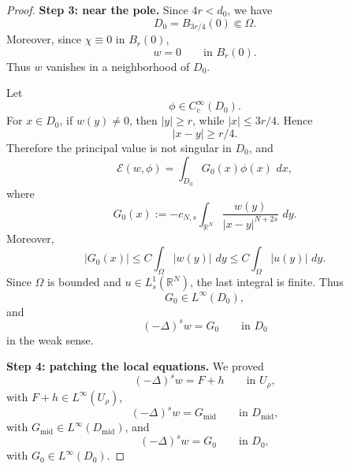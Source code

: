 \documentclass[11pt,a4paper]{article}
\newcommand{\dd}{\,d}
\begin{document}
\begin{proof}
\medskip
\noindent\textbf{Step 3: near the pole.}
Since \(4r<d_0\), we have
\[
D_0=B_{3r/4}(0)\Subset\Omega.
\]
Moreover, since \(\chi\equiv0\) in \(B_r(0)\),
\[
w=0\qquad\text{in }B_r(0).
\]
Thus \(w\) vanishes in a neighborhood of \(D_0\).

Let
\[
\phi\in C_c^\infty(D_0).
\]
For \(x\in D_0\), if \(w(y)\neq0\), then \(|y|\ge r\), while
\(|x|\le3r/4\). Hence
\[
|x-y|\ge r/4.
\]
Therefore the principal value is not singular in \(D_0\), and
\[
\mathcal E(w,\phi)
=
\int_{D_0}G_0(x)\phi(x)\,\dd x,
\]
where
\[
G_0(x)
:=
-c_{N,s}
\int_{\mathbb R^N}
\frac{w(y)}
{|x-y|^{N+2s}}
\,\dd y.
\]
Moreover,
\[
|G_0(x)|
\le
C\int_\Omega |w(y)|\,\dd y
\le
C\int_\Omega |u(y)|\,\dd y.
\]
Since \(\Omega\) is bounded and \(u\in L^1_s(\mathbb R^N)\), the last integral
is finite. Thus
\[
G_0\in L^\infty(D_0),
\]
and
\[
(-\Delta)^s w=G_0
\qquad\text{in }D_0
\]
in the weak sense.

\medskip
\noindent\textbf{Step 4: patching the local equations.}
We proved
\[
(-\Delta)^s w=F+h
\qquad\text{in }U_\rho,
\]
with \(F+h\in L^\infty(U_\rho)\),
\[
(-\Delta)^s w=G_{\mathrm{mid}}
\qquad\text{in }D_{\mathrm{mid}},
\]
with \(G_{\mathrm{mid}}\in L^\infty(D_{\mathrm{mid}})\), and
\[
(-\Delta)^s w=G_0
\qquad\text{in }D_0,
\]
with \(G_0\in L^\infty(D_0)\).


\end{proof}
\end{document}
